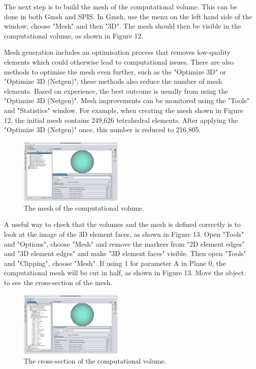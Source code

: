 \documentclass[a4paper, 11pt]{article}
\begin{document}
The next step is to build the mesh of the computational volume. This can be done in both Gmsh and SPIS. In Gmsh, use the menu on the left hand side of the window, choose "Mesh" and then "3D". The mesh should then be visible in the computational volume, as shown in Figure 12.\par
Mesh generation includes an optimisation process that removes low-quality elements which could otherwise lead to computational issues. There are also methods to optimise the mesh even further, such as the "Optimize 3D" or "Optimize 3D (Netgen)", these methods also reduce the number of mesh elements. Based on experience, the best outcome is usually from using the "Optimize 3D (Netgen)". Mesh improvements can be monitored using the "Tools" and "Statistics" window. For example, when creating the mesh shown in Figure 12, the initial mesh contains 249,626 tetrahedral elements. After applying the "Optimize 3D (Netgen)" once, this number is reduced to 216,805.

\begin{figure}[!ht]
    \centering
    \includegraphics[width=0.45\textwidth]{fig12.jpg}
    \caption{The mesh of the computational volume.}
\end{figure}

A useful way to check that the volumes and the mesh is defined correctly is to look at the image of the 3D element faces, as shown in Figure 13. Open "Tools" and "Options", choose "Mesh" and remove the markers from "2D element edges" and "3D element edges" and make "3D element faces" visible. Then open "Tools" and "Clipping", choose "Mesh".  If using 1 for parameter A in Plane 0, the computational mesh will be cut in half, as shown in Figure 13. Move the object to see the cross-section of the mesh.

\begin{figure}[!ht]
    \centering
    \includegraphics[width=0.45\textwidth]{fig13.jpg}
    \caption{The cross-section of the computational volume.}
\end{figure}
\end{document}
